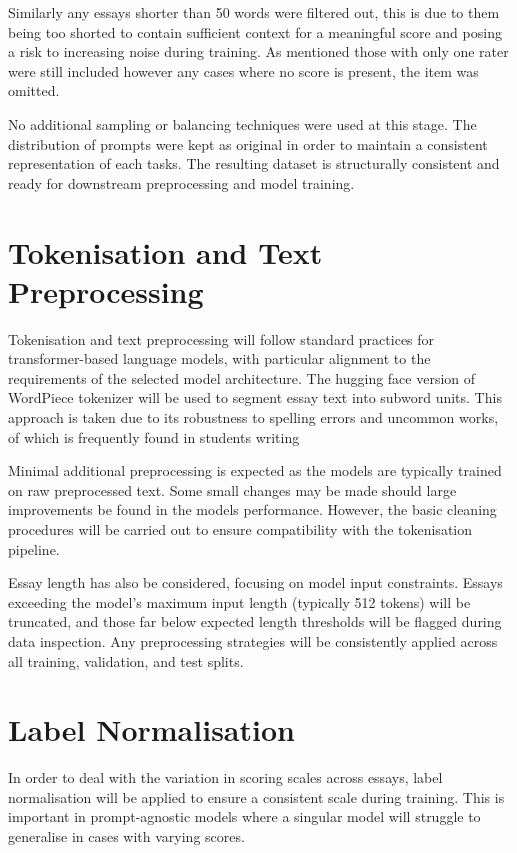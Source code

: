 \documentclass[12pt,a4paper]{report}
\begin{document}
Similarly any essays shorter than 50 words were filtered out, this is due to them being too shorted to contain sufficient context for a meaningful score and posing a risk to increasing noise during training. As mentioned those with only one rater were still included however any cases where no score is present, the item was omitted.

No additional sampling or balancing techniques were used at this stage. The distribution of prompts were kept as original in order to maintain a consistent representation of each tasks. The resulting dataset is structurally consistent and ready for downstream preprocessing and model training.


\section{Tokenisation and Text Preprocessing}
Tokenisation and text preprocessing will follow standard practices for transformer-based language models, with particular alignment to the requirements of the selected model architecture. The hugging face version of WordPiece tokenizer will be used to segment essay text into subword units. This approach is taken due to its robustness to spelling errors and uncommon works, of which is frequently found in students writing

Minimal additional preprocessing is expected as the models are typically trained on raw preprocessed text. Some small changes may be made should large improvements be found in the models performance. However, the basic cleaning procedures will be carried out to ensure compatibility with the tokenisation pipeline.

Essay length has also be considered, focusing on model input constraints. Essays exceeding the model’s maximum input length (typically 512 tokens) will be truncated, and those far below expected length thresholds will be flagged during data inspection. Any preprocessing strategies will be consistently applied across all training, validation, and test splits.

\section{Label Normalisation}
In order to deal with the variation in scoring scales across essays, label normalisation will be applied to ensure a consistent scale during training. This is important in prompt-agnostic models where a singular model will struggle to generalise in cases with varying scores.
\end{document}

